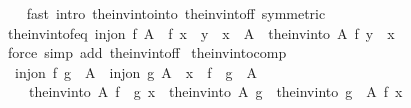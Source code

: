 \begin{isabellebody}
%
\isadelimproof
\ \ %
\endisadelimproof
%
\isatagproof
{}\isamarkupfalse%
\ {\isacharparenleft}{\kern0pt}fast\ intro{\isacharcolon}{\kern0pt}\ the{\isacharunderscore}{\kern0pt}inv{\isacharunderscore}{\kern0pt}into{\isacharunderscore}{\kern0pt}into\ the{\isacharunderscore}{\kern0pt}inv{\isacharunderscore}{\kern0pt}into{\isacharunderscore}{\kern0pt}f{\isacharunderscore}{\kern0pt}f\ {\isacharbrackleft}{\kern0pt}symmetric{\isacharbrackright}{\kern0pt}{\isacharparenright}{\kern0pt}%
\endisatagproof
{\isafoldproof}%
%
\isadelimproof
\isanewline
%
\endisadelimproof
\isanewline
{}\isamarkupfalse%
\ the{\isacharunderscore}{\kern0pt}inv{\isacharunderscore}{\kern0pt}into{\isacharunderscore}{\kern0pt}f{\isacharunderscore}{\kern0pt}eq{\isacharcolon}{\kern0pt}\ {\isachardoublequoteopen}inj{\isacharunderscore}{\kern0pt}on\ f\ A\ {\isasymLongrightarrow}\ f\ x\ {\isacharequal}{\kern0pt}\ y\ {\isasymLongrightarrow}\ x\ {\isasymin}\ A\ {\isasymLongrightarrow}\ the{\isacharunderscore}{\kern0pt}inv{\isacharunderscore}{\kern0pt}into\ A\ f\ y\ {\isacharequal}{\kern0pt}\ x{\isachardoublequoteclose}\isanewline
%
\isadelimproof
\ \ %
\endisadelimproof
%
\isatagproof
{}\isamarkupfalse%
\ {\isacharparenleft}{\kern0pt}force\ simp\ add{\isacharcolon}{\kern0pt}\ the{\isacharunderscore}{\kern0pt}inv{\isacharunderscore}{\kern0pt}into{\isacharunderscore}{\kern0pt}f{\isacharunderscore}{\kern0pt}f{\isacharparenright}{\kern0pt}%
\endisatagproof
{\isafoldproof}%
%
\isadelimproof
\isanewline
%
\endisadelimproof
\isanewline
{}\isamarkupfalse%
\ the{\isacharunderscore}{\kern0pt}inv{\isacharunderscore}{\kern0pt}into{\isacharunderscore}{\kern0pt}comp{\isacharcolon}{\kern0pt}\isanewline
\ \ {\isachardoublequoteopen}inj{\isacharunderscore}{\kern0pt}on\ f\ {\isacharparenleft}{\kern0pt}g\ {\isacharbackquote}{\kern0pt}\ A{\isacharparenright}{\kern0pt}\ {\isasymLongrightarrow}\ inj{\isacharunderscore}{\kern0pt}on\ g\ A\ {\isasymLongrightarrow}\ x\ {\isasymin}\ f\ {\isacharbackquote}{\kern0pt}\ g\ {\isacharbackquote}{\kern0pt}\ A\ {\isasymLongrightarrow}\isanewline
\ \ \ \ the{\isacharunderscore}{\kern0pt}inv{\isacharunderscore}{\kern0pt}into\ A\ {\isacharparenleft}{\kern0pt}f\ {\isasymcirc}\ g{\isacharparenright}{\kern0pt}\ x\ {\isacharequal}{\kern0pt}\ {\isacharparenleft}{\kern0pt}the{\isacharunderscore}{\kern0pt}inv{\isacharunderscore}{\kern0pt}into\ A\ g\ {\isasymcirc}\ the{\isacharunderscore}{\kern0pt}inv{\isacharunderscore}{\kern0pt}into\ {\isacharparenleft}{\kern0pt}g\ {\isacharbackquote}{\kern0pt}\ A{\isacharparenright}{\kern0pt}\ f{\isacharparenright}{\kern0pt}\ x{\isachardoublequoteclose}\isanewline

\end{isabellebody}
